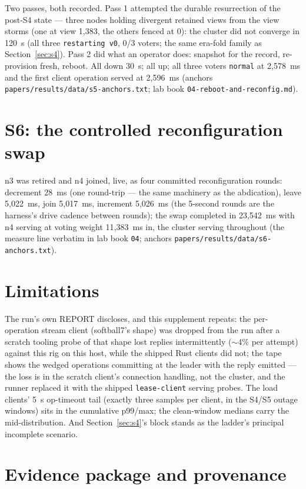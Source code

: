 \documentclass[10pt,journal,letterpaper]{IEEEtran}
\newcommand{\code}[1]{\texttt{\small #1}}
\begin{document}
Two passes, both recorded. Pass 1 attempted the durable resurrection
of the post-S4 state --- three nodes holding divergent retained views
from the view storms (one at view 1{,}383, the others fenced at 0):
the cluster did not converge in 120~s (all three \code{restarting
v0}, 0/3 voters; the same era-fold family as Section~\ref{sec:s4}).
Pass 2 did what an operator does: snapshot for the record,
re-provision fresh, reboot. All down 30~s; all up; all three voters
\code{normal} at 2{,}578~ms and the first client operation served at
2{,}596~ms (anchors \code{papers/results/data/s5-anchors.txt}; lab
book \code{04-reboot-and-reconfig.md}).

\section{S6: the controlled reconfiguration swap}
\label{sec:s6}

n3 was retired and n4 joined, live, as four committed reconfiguration
rounds: decrement 28~ms (one round-trip --- the same machinery as the
abdication), leave 5{,}022~ms, join 5{,}017~ms, increment 5{,}026~ms
(the 5-second rounds are the harness's drive cadence between rounds);
the swap completed in 23{,}542~ms with n4 serving at voting weight
11{,}383~ms in, the cluster serving throughout (the measure line
verbatim in lab book \code{04}; anchors
\code{papers/results/data/s6-anchors.txt}).

\section{Limitations}
\label{sec:limitations}

The run's own REPORT discloses, and this supplement repeats: the
per-operation stream client (softball7's shape) was dropped from the
run after a scratch tooling probe of that shape lost replies
intermittently ($\sim$4\% per attempt) against this rig on this
host, while the shipped Rust clients did not; the tape shows the
wedged operations committing at the leader with the reply emitted ---
the loss is in the scratch client's connection handling, not the
cluster, and the runner replaced it with the shipped
\code{lease-client} serving probes. The load clients' 5~s op-timeout
tail (exactly three samples per client, in the S4/S5 outage windows)
sits in the cumulative p99/max; the clean-window medians carry the
mid-distribution. And Section~\ref{sec:s4}'s block stands as the
ladder's principal incomplete scenario.

\section{Evidence package and provenance}
\label{sec:provenance}
\end{document}
